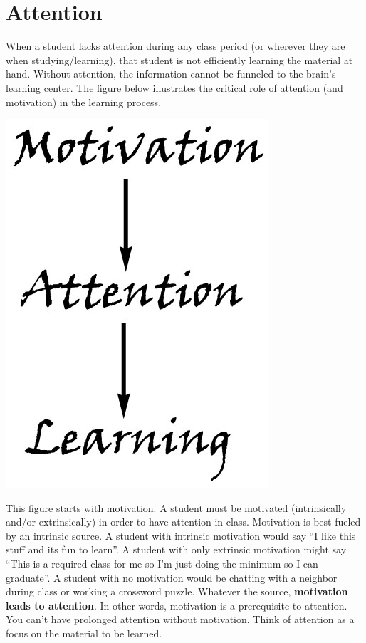 \chapter{Attention}

When a student lacks attention during any class period (or wherever they are when studying/learning), that student is not efficiently learning the material at hand. Without attention, the information cannot be funneled to the brain's learning center. The figure below illustrates the critical role of attention (and motivation) in the learning process.

\begin{marginfigure}%
	\includegraphics[width=0.75\linewidth]{./images/attention}
	\label{fig:attention}
\end{marginfigure}

This figure starts with motivation. A student must be motivated (intrinsically and/or extrinsically) in order to have attention in class. Motivation is best fueled by an intrinsic source. A student with intrinsic motivation would say ``I like this stuff and its fun to learn''. A student with only extrinsic motivation might say ``This is a required class for me so I'm just doing the minimum so I can graduate''. A student with no motivation would be chatting with a neighbor during class or working a crossword puzzle. Whatever the source, \textbf{motivation leads to attention}. In other words, motivation is a prerequisite to attention. You can't have prolonged attention without motivation. Think of attention as a focus on the material to be learned.

